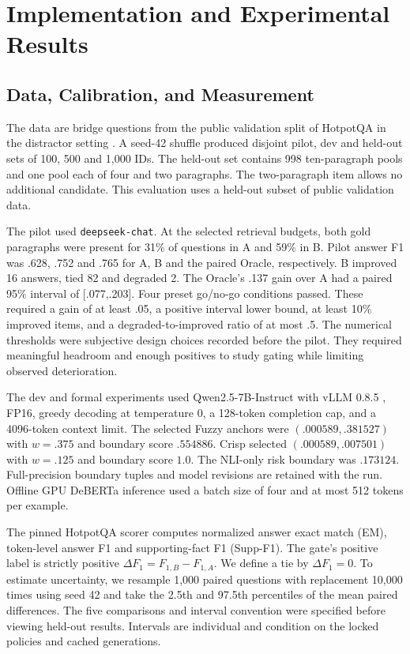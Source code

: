 \section{Implementation and Experimental Results}
\label{sec:results}

\subsection{Data, Calibration, and Measurement}
The data are bridge questions from the public validation split of HotpotQA in the distractor setting \cite{hotpotqa}. A seed-42 shuffle produced disjoint pilot, dev and held-out sets of 100, 500 and 1,000 IDs. The held-out set contains 998 ten-paragraph pools and one pool each of four and two paragraphs. The two-paragraph item allows no additional candidate. This evaluation uses a held-out subset of public validation data.

The pilot used \texttt{deepseek-chat}. At the selected retrieval budgets, both gold paragraphs were present for 31\% of questions in A and 59\% in B. Pilot answer F1 was .628, .752 and .765 for A, B and the paired Oracle, respectively. B improved 16 answers, tied 82 and degraded 2. The Oracle's .137 gain over A had a paired 95\% interval of [.077,.203]. Four preset go/no-go conditions passed. These required a gain of at least .05, a positive interval lower bound, at least 10\% improved items, and a degraded-to-improved ratio of at most .5. The numerical thresholds were subjective design choices recorded before the pilot. They required meaningful headroom and enough positives to study gating while limiting observed deterioration.

The dev and formal experiments used Qwen2.5-7B-Instruct \cite{qwen} with vLLM 0.8.5 \cite{vllm}, FP16, greedy decoding at temperature 0, a 128-token completion cap, and a 4096-token context limit. The selected Fuzzy anchors were $(.000589,.381527)$ with $w=.375$ and boundary score $.554886$. Crisp selected $(.000589,.007501)$ with $w=.125$ and boundary score $1.0$. The NLI-only risk boundary was $.173124$. Full-precision boundary tuples and model revisions are retained with the run. Offline GPU DeBERTa inference used a batch size of four and at most 512 tokens per example.

The pinned HotpotQA scorer \cite{hotpotscorer} computes normalized answer exact match (EM), token-level answer F1 and supporting-fact F1 (Supp-F1). The gate's positive label is strictly positive $\Delta F_1=F_{1,B}-F_{1,A}$. We define a tie by $\Delta F_1=0$. To estimate uncertainty, we resample 1,000 paired questions with replacement 10,000 times using seed 42 and take the 2.5th and 97.5th percentiles of the mean paired differences. The five comparisons and interval convention were specified before viewing held-out results. Intervals are individual and condition on the locked policies and cached generations.

